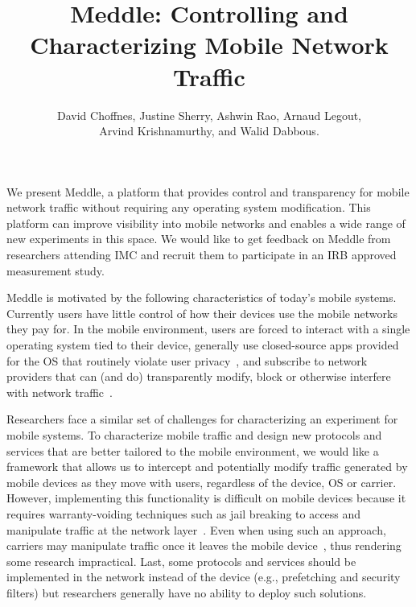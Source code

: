 \documentclass[10pt]{article}
\newcommand{\meddle}{{Meddle}\xspace}
\begin{document}
\title{\bf Meddle: Controlling and Characterizing Mobile Network Traffic}

\author{David Choffnes, Justine Sherry, Ashwin Rao, Arnaud Legout,\\
  Arvind Krishnamurthy, and Walid Dabbous.}

\date{}
\maketitle

\thispagestyle{empty}

We present \meddle, a platform that provides control and transparency
for mobile network traffic without requiring any operating system
modification. This platform can improve visibility into mobile networks
and enables a wide range of new experiments in this space. We would
like to get feedback on \meddle from researchers attending IMC and
recruit them to participate in an IRB approved measurement study.

\meddle is motivated by the following characteristics of today's
mobile systems. Currently users have little control of how their
devices use the mobile networks they pay for. In the mobile
environment, users are forced to interact with a single operating
system tied to their device, generally use closed-source apps provided
for the OS that routinely violate user
privacy~\cite{hornyack:appfence}, and subscribe to network providers
that can (and do) transparently modify, block or otherwise interfere
with network traffic~\cite{wang:middleboxes}.

Researchers face a similar set of challenges for characterizing an
experiment for mobile systems. To characterize mobile traffic and
design new protocols and services that are better tailored to the
mobile environment, we would like a framework that allows us to
intercept and potentially modify traffic generated by mobile devices
as they move with users, regardless of the device, OS or
carrier. However, implementing this functionality is difficult on
mobile devices because it requires warranty-voiding techniques such as
jail breaking to access and manipulate traffic at the network
layer~\cite{enck:taintdroid}. Even when using such an approach,
carriers may manipulate traffic once it leaves the mobile
device~\cite{wang:middleboxes}, thus rendering some research
impractical. Last, some protocols and services should be implemented
in the network instead of the device (e.g., prefetching and security
filters) but researchers generally have no ability to deploy such
solutions.
 
\end{document}
